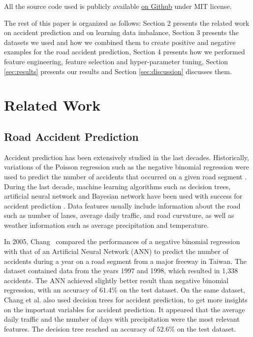 \documentclass[conference]{IEEEtran}
\begin{document}
All the source code used is publicly available \href{https://github.com/big-data-lab-team/accident-prediction-montreal}{on Github} under MIT license.

The rest of this paper is organized as follows: Section 2 presents
the related work on accident prediction and on learning data imbalance, Section 3 presents the datasets we used and
how we combined them to create positive and negative examples for the road
accident prediction, Section 4 presents how we performed feature
engineering, feature selection and hyper-parameter tuning, Section \ref{sec:results}
presents our results and Section \ref{sec:discussion} discusses them.

\section{Related Work}
\subsection{Road Accident Prediction}
Accident prediction has been extensively studied in the last decades.
Historically, variations of the Poisson regression such as the negative
binomial regression were used to predict the number of accidents that
occurred on a given road segment \cite{Milton1998}. During the last decade,
machine learning algorithms such as decision trees, artificial neural network
and Bayesian network have been used with success for accident prediction
\cite{Chang2005, Chang2005b, Lin2015, Theofilatos2017}.
Data features usually include information about the road such as number of
lanes, average daily traffic, and road curvature, as well as weather
information such as average precipitation and temperature. 

In 2005,
Chang~\cite{Chang2005} compared the performances of a negative binomial
regression with that of an Artificial Neural Network (ANN) to predict the number
of accidents during a year on a road segment from a major freeway in
Taiwan. The dataset contained data from the years 1997 and 1998, which
resulted in 1,338 accidents. The ANN achieved slightly better result than negative 
binomial regression, with
an accuracy of $61.4\%$ on the test dataset. On the same dataset, Chang et
al.\cite{Chang2005b} also used decision trees for accident prediction,
 to get more insights on the important variables for accident
prediction. It appeared that the average daily traffic and the number of
days with precipitation were the most relevant features. The decision tree
reached an accuracy of $52.6\%$ on the test dataset. 
\end{document}
